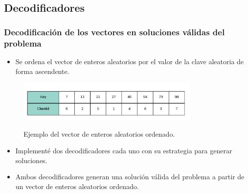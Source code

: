 \documentclass{beamer}
\begin{document}

\subsection{Decodificadores}

\begin{frame}
\frametitle{Decodificación de los vectores en soluciones válidas del problema}

\begin{itemize}
    \item Se ordena el vector de enteros aleatorios por el valor de la clave aleatoria de forma ascendente.
    \pause
\end{itemize}

\begin{figure}[h]
	\caption{Ejemplo del vector de enteros aleatorios ordenado.}
	\centering
	\includegraphics[width=9cm]{RandomKeysOrdenado}
	\label{fig:RandomKeysOrdenado}
\end{figure}

\begin{itemize}
    \pause
    \item Implementé dos decodificadores cada uno con su estrategia para generar soluciones.
    \pause
    \item Ambos decodificadores generan una solución válida del problema a partir de un vector de enteros aleatorios ordenado.
\end{itemize}

\end{frame}

\end{document}

